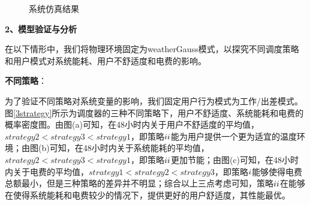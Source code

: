 	\begin{figure}
	\centering
	\caption{系统仿真结果}
	\label{simulation}
	\end{figure}

\textbf{2、模型验证与分析}

	在以下情形中，我们将物理环境固定为weatherGauss模式，以探究不同调度策略和用户模式对系统能耗、用户不舒适度和电费的影响。
	
	\textbf{不同策略}：	
	
	为了验证不同策略对系统变量的影响，我们固定用户行为模式为工作/出差模式。
	图\ref{3strategy}所示为调度器的三种不同策略下，用户不舒适度、系统能耗和电费的概率密度图。由图(a)可知，在48小时内关于用户不舒适度的平均值，$strategy2<strategy3<strategy1$，即策略$\uppercase\expandafter{\romannumeral2}$能为用户提供一个更为适宜的温度环境；由图(b)可知，在48小时内关于系统能耗的平均值，$strategy2<strategy3<strategy1$，即策略$\uppercase\expandafter{\romannumeral2}$更加节能；由图(c)可知，在48小时内关于电费的平均值，$strategy1<strategy2<strategy3$，即策略$\uppercase\expandafter{\romannumeral1}$能够使得电费总额最小，但是三种策略的差异并不明显；综合以上三点考虑可知，策略$\uppercase\expandafter{\romannumeral2}$在能够在使得系统能耗和电费较少的情况下，提供更好的用户舒适度，其性能最优。
	

